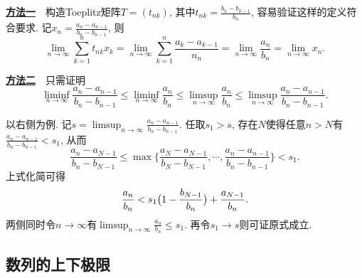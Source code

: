 \begin{solution}
	\underline{\textbf{方法一}}~~构造Toeplitz矩阵$T=(t_{nk})$, 其中$t_{nk}=\frac{b_k-b_{k-1}}{b_n}$, 容易验证这样的定义符合要求. 记$x_n = \frac{a_n-a_{n-1}}{b_n-b_{n-1}}$, 则$$\lim_{n\to \infty} \sum_{k=1}^{n} t_{nk}x_k = \lim_{n\to \infty} \sum_{k=1}^{n} \frac{a_k-a_{k-1}}{n_n} =\lim_{n\to \infty} \frac{a_n}{b_n} = \lim_{n\to \infty} x_n. $$
	
	\underline{\textbf{方法二}}~~只需证明$$\liminf_{n\to \infty} \frac{a_n-a_{n-1}}{b_n-b_{n-1}} \leq \liminf_{n\to \infty} \frac{a_n}{b_n} \leq \limsup_{n\to \infty} \frac{a_n}{b_n} \leq \limsup_{n\to \infty} \frac{a_n-a_{n-1}}{b_n-b_{n-1}}.$$
	
	以右侧为例. 记$s = \limsup_{n\to \infty} \frac{a_n-a_{n-1}}{b_n-b_{n-1}}$. 任取$s_1>s$, 存在$N$使得任意$n>N$有$\frac{a_n-a_{n-1}}{b_n-b_{n-1}} <s_1$, 从而$$\frac{a_n-a_{N-1}}{b_n-b_{N-1}} \leq \max \big\{ \frac{a_N-a_{N-1}}{b_N-b_{N-1}},\cdots ,\frac{a_n-a_{n-1}}{b_n-b_{n-1}} \big\} < s_1. $$
	上式化简可得$$\frac{a_n}{b_n} < s_1\big( 1-\frac{b_{N-1}}{b_n} \big) + \frac{a_{N-1}}{b_n}. $$
	两侧同时令$n\to \infty$有$\limsup_{n\to \infty} \frac{a_n}{b_n} \leq s_1$. 再令$s_1\to s$则可证原式成立. 
\end{solution}

\clearpage
\subsection{数列的上下极限}

